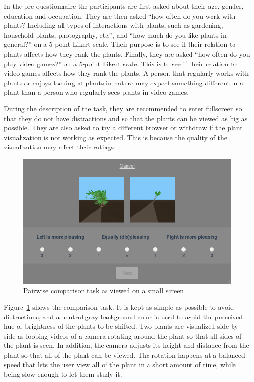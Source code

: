 In the pre-questionnaire the participants are first asked about their age, gender, education and occupation.
They are then asked ``how often do you work with plants? Including all types of interactions with plants, such as gardening, household plants, photography, etc.'', and ``how much do you like plants in general?'' on a 5-point Likert scale.
Their purpose is to see if their relation to plants affects how they rank the plants.
Finally, they are asked ``how often do you play video games?'' on a 5-point Likert scale.
This is to see if their relation to video games affects how they rank the plants.
A person that regularly works with plants or enjoys looking at plants in nature may expect something different in a plant than a person who regularly sees plants in video games.

During the description of the task, they are recommended to enter fullscreen so that they do not have distractions and so that the plants can be viewed as big as possible.
They are also asked to try a different browser or withdraw if the plant visualization is not working as expected.
This is because the quality of the visualization may affect their ratings.

\begin{figure}
    \centering
    \includegraphics[width=1.0\textwidth]{figures/pairwise}
    \caption{Pairwise comparison task as viewed on a small screen}
    \label{fig:pairwise}
\end{figure}

Figure~\ref{fig:pairwise} shows the comparison task.
It is kept as simple as possible to avoid distractions, and a neutral gray background color is used to avoid the perceived hue or brightness of the plants to be shifted.
Two plants are visualized side by side as looping videos of a camera rotating around the plant so that all sides of the plant is seen.
In addition, the camera adjusts its height and distance from the plant so that all of the plant can be viewed.
The rotation happens at a balanced speed that lets the user view all of the plant in a short amount of time, while being slow enough to let them study it.


